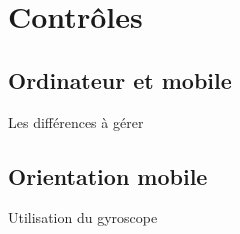 \section{Contrôles}
\subsection{Ordinateur et mobile}
Les différences à gérer
\subsection{Orientation mobile}
Utilisation du gyroscope